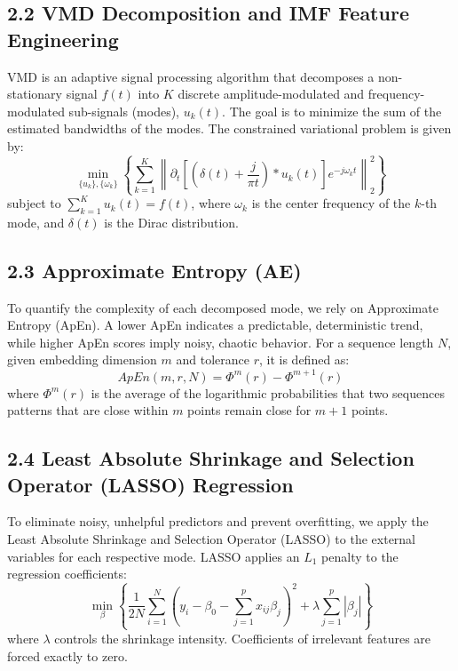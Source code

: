 \documentclass[11pt,a4paper]{article}
\begin{document}
\subsection{2.2 VMD Decomposition and IMF Feature Engineering}
VMD is an adaptive signal processing algorithm that decomposes a non-stationary signal $f(t)$ into $K$ discrete amplitude-modulated and frequency-modulated sub-signals (modes), $u_k(t)$. The goal is to minimize the sum of the estimated bandwidths of the modes. The constrained variational problem is given by:
\begin{equation}
\min_{\{u_k\}, \{\omega_k\}} \left\{ \sum_{k=1}^K \left\| \partial_t \left[\left(\delta(t) + \frac{j}{\pi t}\right) * u_k(t)\right] e^{-j \omega_k t} \right\|_2^2 \right\}
\end{equation}
subject to $\sum_{k=1}^K u_k(t) = f(t)$, where $\omega_k$ is the center frequency of the $k$-th mode, and $\delta(t)$ is the Dirac distribution.

\subsection{2.3 Approximate Entropy (AE)}
To quantify the complexity of each decomposed mode, we rely on Approximate Entropy (ApEn). A lower ApEn indicates a predictable, deterministic trend, while higher ApEn scores imply noisy, chaotic behavior. For a sequence length $N$, given embedding dimension $m$ and tolerance $r$, it is defined as:
\begin{equation}
ApEn(m, r, N) = \Phi^m(r) - \Phi^{m+1}(r)
\end{equation}
where $\Phi^m(r)$ is the average of the logarithmic probabilities that two sequences patterns that are close within $m$ points remain close for $m+1$ points.

\subsection{2.4 Least Absolute Shrinkage and Selection Operator (LASSO) Regression}
To eliminate noisy, unhelpful predictors and prevent overfitting, we apply the Least Absolute Shrinkage and Selection Operator (LASSO) to the external variables for each respective mode. LASSO applies an $L_1$ penalty to the regression coefficients:
\begin{equation}
\min_{\beta} \left\{ \frac{1}{2N} \sum_{i=1}^N \left( y_i - \beta_0 - \sum_{j=1}^p x_{ij}\beta_j \right)^2 + \lambda \sum_{j=1}^p |\beta_j| \right\}
\end{equation}
where $\lambda$ controls the shrinkage intensity. Coefficients of irrelevant features are forced exactly to zero.
\end{document}
